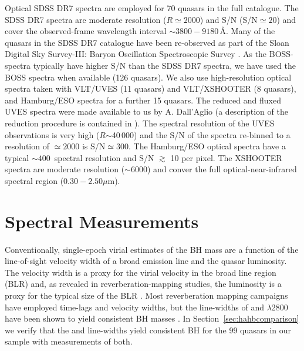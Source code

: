 Optical SDSS DR7 spectra are employed for 70 quasars in the full catalogue.  
The SDSS DR7 spectra are moderate resolution ($R$$\simeq2000$) and S/N (S/N$\simeq20$) and cover the observed-frame wavelength interval $\sim3800-9180$\,\AA.
Many of the quasars in the SDSS DR7 catalogue have been re-observed as part of the Sloan Digital Sky Survey-III: Baryon Oscillation Spectroscopic Survey \citep[SDSS-III/BOSS;][]{dawson13}. 
As the BOSS-spectra typically have higher S/N than the SDSS DR7 spectra, we have used the BOSS spectra when available (126 quasars).  
We also use high-resolution optical spectra taken with VLT/UVES (11 quasars) and VLT/XSHOOTER (8 quasars), and Hamburg/ESO spectra for a further 15 quasars. 
The reduced and fluxed UVES spectra were made available to us by A. Dall'Aglio (a description of the reduction procedure is contained in \citet{dallaglio08}).
The spectral resolution of the UVES observations is very high ($R$$\sim$40\,000) and the S/N of the spectra re-binned to a resolution of $\simeq2000$ is S/N$\simeq300$.  
The Hamburg/ESO optical spectra have a typical $\sim400$\kms\, spectral resolution and S/N $\gtrsim$ 10 per pixel. 
The XSHOOTER spectra are moderate resolution ($\sim6000$) and conver the full optical-near-infrared spectral region ($0.30-2.50\mu$m). 

\section{Spectral Measurements}
\label{sec:spec_measures}

Conventionally, single-epoch virial estimates of the BH mass are a function of the line-of-sight velocity width of a broad emission line and the quasar luminosity. 
The velocity width is a proxy for the virial velocity in the broad line region (BLR) and, as revealed in reverberation-mapping studies, the luminosity is a proxy for the typical size of the BLR \citep[the $R-L$ relation; e.g.][]{kaspi00,kaspi07}. 
Most reverberation mapping campaigns have employed \hb time-lags and velocity widths, but the line-widths of \ha and $\lambda$2800 have been shown to yield consistent BH masses \citep[e.g.][]{mclure02,greene05b,onken08,shen08,wang09,rafiee11,mejia-restrepo16}. 
In Section~\ref{sec:hahbcomparison} we verify that the \ha and \hb line-widths yield consistent BH for the 99 quasars in our sample with measurements of both.     

